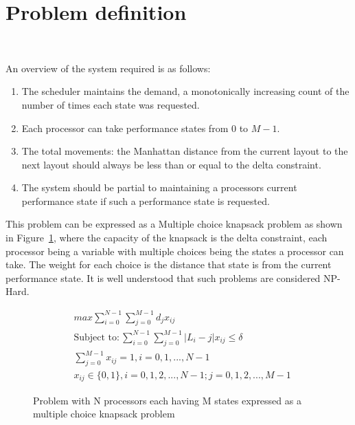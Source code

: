 \section{Problem definition}~\label{sec:ago}

An overview of the system required is as follows:
\begin{enumerate}
\item The scheduler maintains the demand, a monotonically increasing count of the number
of times each state was requested. 
\item Each processor can take performance states from $0$ to $M-1$. 
\item The total movements: the Manhattan distance from the current layout to the next layout 
should always be less than or equal to the delta constraint. 
\item The system should be partial to maintaining a processors current performance state if such a performance state is requested.
\end{enumerate}

This problem can be expressed as a Multiple choice knapsack problem as shown in Figure~\ref{fig:mckp}, where the capacity of the knapsack 
is the delta constraint, each processor being a variable with multiple choices being the states 
a processor can take. The weight for each choice is the distance that state is from the current 
performance state. It is well understood that such problems are considered NP-Hard.

\begin{figure}[h!]
\centering
\begin{align*}
    & max \displaystyle\sum_{i=0}^{N-1} \displaystyle\sum_{j=0}^{M-1} d_jx_{ij} \\
    & \text{Subject to} : \displaystyle\sum_{i=0}^{N-1} \displaystyle\sum_{j=0}^{M-1} |L_i - j| x_{ij} \leq \delta \\
    & \displaystyle\sum_{j=0}^{M-1} x_{ij} = 1 , i = 0, 1, ..., N-1 \\
    & x_{ij} \in \{0,1\} , i = 0,1,2,...,N-1 ; j = 0,1,2,...,M-1  
\end{align*}
\caption{Problem with N processors each having M states expressed as a multiple choice knapsack problem}
\label{fig:mckp}
\end{figure}

